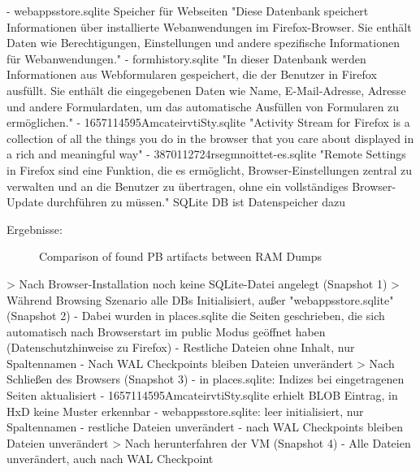 		- webappsstore.sqlite					Speicher für Webseiten
			"Diese Datenbank speichert Informationen über installierte Webanwendungen im Firefox-Browser. Sie enthält Daten wie Berechtigungen, Einstellungen und andere spezifische Informationen für Webanwendungen."
		- formhistory.sqlite
			"In dieser Datenbank werden Informationen aus Webformularen gespeichert, die der Benutzer in Firefox ausfüllt. Sie enthält die eingegebenen Daten wie Name, E-Mail-Adresse, Adresse und andere Formulardaten, um das automatische Ausfüllen von Formularen zu ermöglichen."
		- 1657114595AmcateirvtiSty.sqlite		
			"Activity Stream for Firefox is a collection of all the things you do in the browser that you care about displayed in a rich and meaningful way" %
		- 3870112724rsegmnoittet-es.sqlite		%
			"Remote Settings in Firefox sind eine Funktion, die es ermöglicht, Browser-Einstellungen zentral zu verwalten und an die Benutzer zu übertragen, ohne ein vollständiges Browser-Update durchführen zu müssen."
			SQLite DB ist Datenspeicher dazu
		
	Ergebnisse:
		\begin{figure}[h!]
			\centerline{}
			\label{chart:final-criteria}  
			\caption{Comparison of found PB artifacts between RAM Dumps}
		\end{figure}
		> Nach Browser-Installation noch keine SQLite-Datei angelegt (Snapshot 1)
		> Während Browsing Szenario alle DBs Initialisiert, außer "webappsstore.sqlite" (Snapshot 2)
			- Dabei wurden in places.sqlite die Seiten geschrieben, die sich automatisch nach Browserstart im public Modus geöffnet haben (Datenschutzhinweise zu Firefox)
			- Restliche Dateien ohne Inhalt, nur Spaltennamen
			- Nach WAL Checkpoints bleiben Dateien unverändert
		> Nach Schließen des Browsers (Snapshot 3)
			- in places.sqlite: Indizes bei eingetragenen Seiten aktualisiert
			- 1657114595AmcateirvtiSty.sqlite erhielt BLOB Eintrag, in HxD keine Muster erkennbar
			- webappsstore.sqlite: leer initialisiert, nur Spaltennamen
			- restliche Dateien unverändert
			- nach WAL Checkpoints bleiben Dateien unverändert
		> Nach herunterfahren der VM (Snapshot 4)
			- Alle Dateien unverändert, auch nach WAL Checkpoint
	

